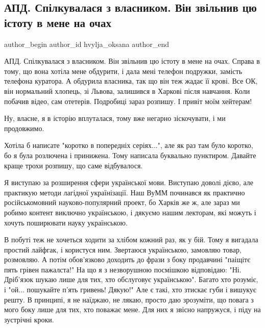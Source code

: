  
 
 
 
 
 
\subsection{АПД. Спілкувалася з власником. Він звільнив цю істоту в мене на очах}
\label{sec:24_07_2021.fb.hvylja_oksana.1.uvolnenie_harkov_kiosk}
 
\ifcmt
 author_begin
   author_id hvylja_oksana
 author_end
\fi

АПД. Спілкувалася з власником. Він звільнив цю істоту в мене на очах. Справа в
тому, що вона хотіла мене обдурити, і дала мені телефон подружки, замість
телефона куратора. А обдурила власника, так що він теж жадає її крові. Все ОК,
він нормальний хлопець, зі Львова, залишився в Харкові після навчання. Коли
побачив відео, сам отетерів. Подробиці зараз розпишу. І привіт моїм хейтерам!

Ну, власне, я в історію вплуталася, тому вже негарно зіскочувати, і ми продовжимо.

Хотіла б написате "коротко в попередніх серіях...", але як раз там було
коротко, бо я була розлючена і принижена. Тому написала буквально пунктиром.
Давайте краще трохи розпишу, що саме відбувалося.

Я виступаю за розширення сфери української мови. Виступаю доволі дієво, але
практикую методи лагідної українізації. Наш ВуММ починався як практично
російськомовний науково-популярний проект, бо Харків же ж, але зараз ми робимо
контент виключно українською, і дякуємо нашим лекторам, які можуть і хочуть
поширювати науку українською.

В побуті теж не хочеться ходити за хлібом кожний раз, як у бій. Тому я вигадала
простий лайфгак, і користуся ним. Звертаюся українською,  замовляю товар,
розмовляю. А потім обов'язково доходить до фрази з боку продавчині "паіщітє
пять грівен пажалста!" На що я з незворушною посмішкою відповідаю: "Ні.
Дріб'язок шукаю лише для тих, хто обслуговує українською". Багато хто розуміє,
і "ой... пошукайте п'ять гривень! Дякую!" Але є такі, хто зтискає губи і
вишукує решту. В принципі, я не наїджаю, не лякаю, просто даю зрозуміти, що
повага з мого боку лише для тих, хто поважає мене. Для них я звісно напружуся,
і піду на зустрічні кроки.

